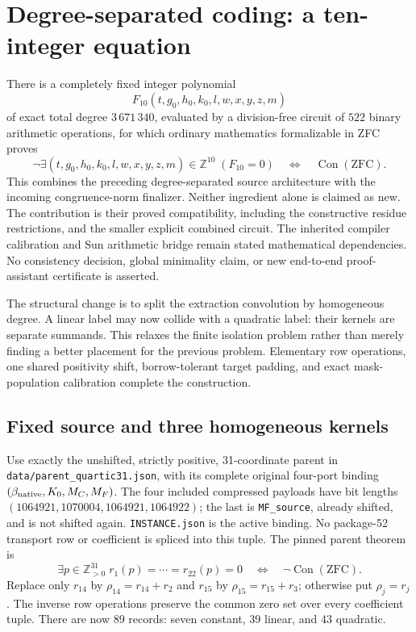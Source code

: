 \section{Degree-separated coding: a ten-integer equation}
\label{sec:wave9-signed}

There is a completely fixed integer polynomial
\[
 F_{10}(t,g_0,h_0,k_0,l,w,x,y,z,m)
\]
of exact total degree $3\,671\,340$, evaluated by a division-free circuit of
$522$ binary arithmetic operations, for which ordinary mathematics
formalizable in ZFC proves
\[
 \neg\exists(t,g_0,h_0,k_0,l,w,x,y,z,m)\in\mathbb Z^{10}\;(F_{10}=0)
 \quad\Longleftrightarrow\quad\operatorname{Con}(\mathrm{ZFC}).
\]
This combines the preceding degree-separated source architecture with the incoming congruence-norm finalizer. Neither ingredient alone is claimed as new. The contribution is their proved compatibility, including the constructive residue restrictions, and the smaller explicit combined circuit.
The inherited compiler calibration and Sun arithmetic bridge remain stated
mathematical dependencies. No consistency decision, global minimality claim,
or new end-to-end proof-assistant certificate is asserted.

The structural change is to split the extraction convolution by homogeneous
degree. A linear label may now collide with a quadratic label: their kernels
are separate summands. This relaxes the finite isolation problem rather than
merely finding a better placement for the previous problem. Elementary row
operations, one shared positivity shift, borrow-tolerant target padding,
and exact mask-population calibration complete the construction.

\subsection{Fixed source and three homogeneous kernels}

Use exactly the unshifted, strictly positive, 31-coordinate parent in
\texttt{data/parent\_quartic31.json}, with its complete original four-port
binding $(\beta_{\rm native},K_0,M_C,M_F)$. The four included compressed
payloads have bit lengths $(1064921,1070004,1064921,1064922)$; the last is
\texttt{MF\_source}, already shifted, and is not shifted again.
\texttt{INSTANCE.json} is the active binding. No package-52 transport row or
coefficient is spliced into this tuple. The pinned parent theorem is
\[
 \exists p\in\mathbb Z_{>0}^{31}\;r_1(p)=\cdots=r_{22}(p)=0
 \quad\Longleftrightarrow\quad\neg\operatorname{Con}(\mathrm{ZFC}).
\]
Replace only $r_{14}$ by $\rho_{14}=r_{14}+r_2$ and $r_{15}$ by
$\rho_{15}=r_{15}+r_3$; otherwise put $\rho_j=r_j$. The inverse row
operations preserve the common zero set over every coefficient tuple.
There are now 89 records: seven constant, 39 linear, and 43 quadratic.

